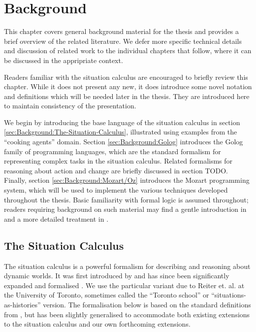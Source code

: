 

\chapter{Background}

\label{ch:background}

This chapter covers general background material for the thesis and
provides a brief overview of the related literature. We defer more
specific technical details and discussion of related work to the individual
chapters that follow, where it can be discussed in the appripriate
context.

Readers familiar with the situation calculus are encouraged to briefly
review this chapter. While it does not present any new, it does introduce
some novel notation and definitions which will be needed later in
the thesis. They are introduced here to maintain consistency of the
presentation.

We begin by introducing the base language of the situation calculus
in section \ref{sec:Background:The-Situation-Calculus}, illustrated
using examples from the {}``cooking agents'' domain. Section \ref{sec:Background:Golog}
introduces the Golog family of programming languages, which are the
standard formalism for representing complex tasks in the situation
calculus. Related formalisms for reasoning about action and change
are briefly discussed in section TODO. Finally, section \ref{sec:Background:Mozart/Oz}
introduces the Mozart programming system, which will be used to implement
the various techniques developed throughout the thesis. Basic familiarity
with formal logic is assumed throughout; readers requiring background
on such material may find a gentle introduction in \citep{kelly96logic}
and a more detailed treatment in \citep{fitting96fol_book}.


\section{The Situation Calculus\label{sec:Background:The-Situation-Calculus}}

The situation calculus is a powerful formalism for describing and
reasoning about dynamic worlds. It was first introduced by \citet{McCHay69sitcalc}
and has since been significantly expanded and formalised \citep{reiter91frameprob,pirri99contributions_sitcalc}.
We use the particular variant due to Reiter et. al. at the University
of Toronto, sometimes called the {}``Toronto school'' or {}``situations-as-histories''
version. The formalisation below is based on the standard definitions
from \citep{levesque98sc_foundations,pirri99contributions_sitcalc,reiter01kia},
but has been slightly generalised to accommodate both existing extensions
to the situation calculus and our own forthcoming extensions.

